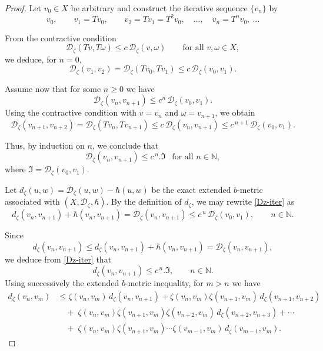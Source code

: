 \documentclass[sn-mathphys-num]{sn-jnl}%
\theoremstyle{thmstyleone}%
\theoremstyle{thmstyletwo}%
\theoremstyle{thmstylethree}%
\numberwithin{equation}{section}
\begin{document}
\begin{proof}
Let $v_{0}\in X$ be arbitrary and construct the iterative sequence 
$\{v_{n}\}$ by
\[
v_{0}, \qquad v_{1}=T v_{0}, \qquad v_{2}=T v_{1}=T^{2}v_{0},\quad \dots,\quad 
v_{n}=T^{n}v_{0},\ \dots
\]

From the contractive condition
\[
\mathcal{D}_{\zeta}(T v,T \omega) \le c\,\mathcal{D}_{\zeta}(v,\omega)
\qquad \text{for all } v,\omega\in X,
\]
we deduce, for $n=0$,
\[
\mathcal{D}_{\zeta}(v_{1},v_{2})
= \mathcal{D}_{\zeta}(T v_{0},T v_{1})
\le c\,\mathcal{D}_{\zeta}(v_{0},v_{1}).
\]

Assume now that for some $n\ge0$ we have
\[
\mathcal{D}_{\zeta}(v_{n},v_{n+1})
\le c^{n}\,\mathcal{D}_{\zeta}(v_{0},v_{1}).
\]
Using the contractive condition with $v=v_{n}$ and $\omega=v_{n+1}$, we obtain
\[
\mathcal{D}_{\zeta}(v_{n+1},v_{n+2})
= \mathcal{D}_{\zeta}(T v_{n},T v_{n+1})
\le c\, \mathcal{D}_{\zeta}(v_{n},v_{n+1})
\le c^{\,n+1}\,\mathcal{D}_{\zeta}(v_{0},v_{1}).
\]

Thus, by induction on $n$, we conclude that
\begin{equation}\label{Dz-iter}
\mathcal{D}_{\zeta}(v_{n},v_{n+1})
\le c^{\,n}.\Im ~~\text{ for all } n\in\mathbb{N},
\end{equation}
where $\Im=\mathcal{D}_{\zeta}(v_{0},v_{1}).$


Let \(
d_{\zeta}(u,w)=\mathcal{D}_{\zeta}(u,w)-\hbar(u,w)
\)
be the exact extended $b$-metric associated with $(X,\mathcal{D}_{\zeta},\hbar)$.  By the definition of $d_{\zeta}$, we may rewrite \eqref{Dz-iter} as
\[
d_{\zeta}(v_n,v_{n+1}) + \hbar(v_n,v_{n+1})
= \mathcal{D}_{\zeta}(v_n,v_{n+1})
\le c^{\,n}\,\mathcal{D}_{\zeta}(v_0,v_1), \qquad n\in\mathbb{N}.
\]

Since
\[
d_{\zeta}(v_n,v_{n+1})
\le d_{\zeta}(v_n,v_{n+1})+\hbar(v_n,v_{n+1})
= \mathcal{D}_{\zeta}(v_n,v_{n+1}),
\]
we deduce from \eqref{Dz-iter} that
\begin{equation}\label{dz-final}
d_{\zeta}(v_n,v_{n+1})
\le c^{\,n}.\Im,
\qquad n\in\mathbb{N}.
\end{equation}
Using successively the extended $b$-metric inequality, for $m>n$ we have
\[
\begin{aligned}
d_{\zeta}(v_n , v_m)
&\le \zeta(v_n , v_m)\, d_{\zeta}(v_n , v_{n+1})
   + \zeta(v_n , v_m)\zeta(v_{n+1},v_m)\, d_{\zeta}(v_{n+1},v_{n+2})  \\
&\quad +\; \zeta(v_n , v_m)\zeta(v_{n+1},v_m)\zeta(v_{n+2},v_m)\,
          d_{\zeta}(v_{n+2},v_{n+3}) + \cdots \\
&\quad +\; \zeta(v_n , v_m)\zeta(v_{n+1},v_m)\cdots \zeta(v_{m-1},v_m)\,
          d_{\zeta}(v_{m-1},v_m).
\end{aligned}
\]


\end{proof}
\end{document}
